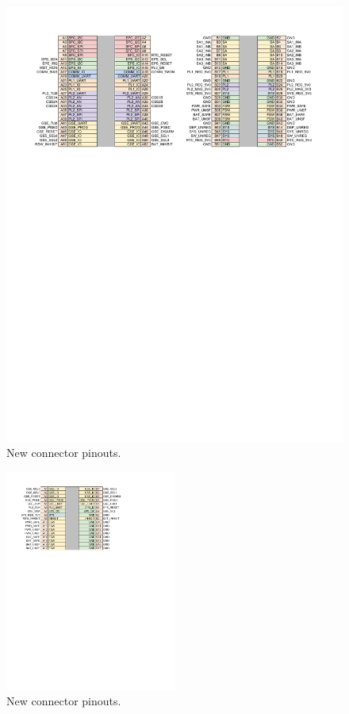 \begin{figure}[htbp]
	\centering
	\includegraphics[width=\textwidth]{../figs/phoenix/concept/new_bus.pdf}
	\caption{New connector pinouts.}
	\label{fig:eps_bus}
\end{figure}

\begin{figure}[htbp]
	\centering
	\includegraphics[width=0.5\textwidth]{../figs/phoenix/concept/egse_pins.pdf}
	\caption{New connector pinouts.}
	\label{fig:egse_pins}
\end{figure}

